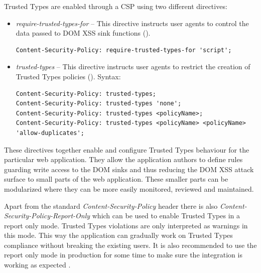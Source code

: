 Trusted Types are enabled through a CSP using two different directives:

\begin{itemize}
  \item \emph{require-trusted-types-for} -- This directive instructs user agents to control the
        data passed to DOM XSS sink functions (\cite{mdn:require-trusted-types-for}).

        \bigskip
        \begin{lstlisting}[language={}, caption=Syntax of \emph{require-trusted-types-for directive}]
Content-Security-Policy: require-trusted-types-for 'script';\end{lstlisting}

  \item \emph{trusted-types} -- This directive instructs user agents to restrict the creation of
        Trusted Types policies (\cite{mdn:trusted-types}). Syntax:

        \bigskip
        \begin{lstlisting}[language={}, caption=Syntax of \emph{trusted-types directive}]
Content-Security-Policy: trusted-types;
Content-Security-Policy: trusted-types 'none';
Content-Security-Policy: trusted-types <policyName>;
Content-Security-Policy: trusted-types <policyName> <policyName> 'allow-duplicates';\end{lstlisting}

\end{itemize}

These directives together enable and configure Trusted Types behaviour for the particular web
application. They allow the application authors to define rules guarding write access to the DOM
sinks and thus reducing the DOM XSS attack surface to small parts of the web application. These
smaller parts can be modularized where they can be more easily monitored, reviewed and maintained.

Apart from the standard \emph{Content-Security-Policy} header there is also
\emph{Content-Security-Policy-Report-Only} which can be used to enable Trusted Types in a report
only mode. Trusted Types violations are only interpreted as warnings in this mode. This way the
application can gradually work on Trusted Types compliance without breaking the existing users. It
is also recommended to use the report only mode in production for some time to make sure the
integration is working as expected \cite{tt_web_framework_paper}.

